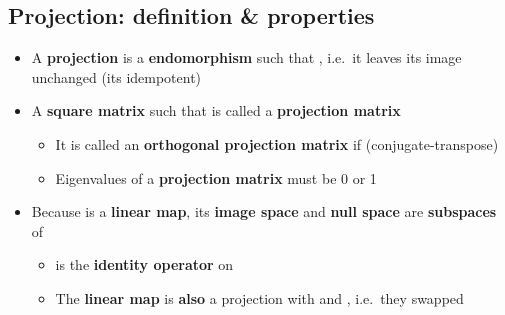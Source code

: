 \subsection*{Projection: definition \& properties}

\begin{itemize}
      \item
            A \textbf{projection}  is a \textbf{endomorphism}
            such that \iMbox{\ds \pi \circ \pi = \pi}, i.e.~it leaves its image
            unchanged (its idempotent)
      \item
            A \textbf{square matrix}  such that  is called
            a \textbf{projection matrix}

            \begin{itemize}

                  \item
                        It is called an \textbf{orthogonal projection matrix} if
                         (conjugate-transpose)
                  \item
                        Eigenvalues of a \textbf{projection matrix} must be 0 or 1
            \end{itemize}
      \item
            Because  is a \textbf{linear map}, its
            \textbf{image space}  and \textbf{null
                  space}  are \textbf{subspaces} of

            \begin{itemize}

                  \item
                        \iMbox{\pi} is the \textbf{identity operator} on 
                  \item
                        The \textbf{linear map}  is
                        \textbf{also} a projection with
                         and
                        , i.e.~they
                        swapped

                        \begin{itemize}


\end{itemize}
\end{itemize}
\end{itemize}
